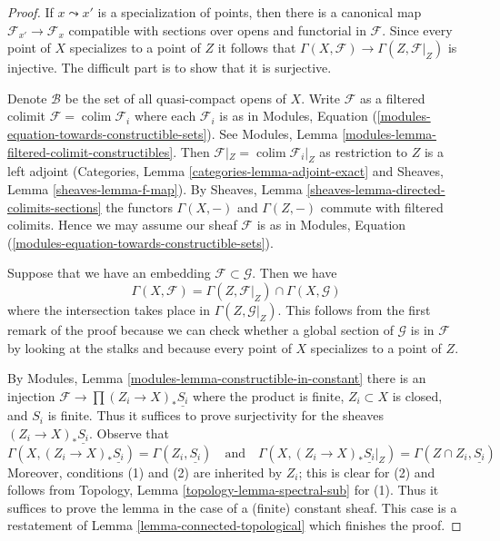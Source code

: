\documentclass[10pt,a4paper]{amsart}
\theoremstyle{plain}
\theoremstyle{definition}
\theoremstyle{remark}
\numberwithin{equation}{subsection}
\def\colim{\mathop{\mathrm{colim}}\nolimits}
\begin{document}
\begin{proof}
If $x \leadsto x'$ is a specialization of points, then there is a
canonical map $\mathcal{F}_{x'} \to \mathcal{F}_x$ compatible with
sections over opens and functorial in $\mathcal{F}$. Since every point
of $X$ specializes to a point of $Z$ it follows that
$\Gamma(X, \mathcal{F}) \to \Gamma(Z, \mathcal{F}|_Z)$ is injective.
The difficult part is to show that it is surjective.

\medskip\noindent
Denote $\mathcal{B}$ be the set of all quasi-compact opens of $X$.
Write $\mathcal{F}$ as a filtered colimit $\mathcal{F} = \colim \mathcal{F}_i$
where each $\mathcal{F}_i$ is as in
Modules, Equation (\ref{modules-equation-towards-constructible-sets}).
See Modules, Lemma \ref{modules-lemma-filtered-colimit-constructibles}.
Then $\mathcal{F}|_Z = \colim \mathcal{F}_i|_Z$ as restriction to $Z$
is a left adjoint (Categories, Lemma \ref{categories-lemma-adjoint-exact} and
Sheaves, Lemma \ref{sheaves-lemma-f-map}).
By Sheaves, Lemma \ref{sheaves-lemma-directed-colimits-sections}
the functors $\Gamma(X, -)$ and $\Gamma(Z, -)$ commute with filtered colimits.
Hence we may assume our sheaf $\mathcal{F}$ is as in
Modules, Equation (\ref{modules-equation-towards-constructible-sets}).

\medskip\noindent
Suppose that we have an embedding $\mathcal{F} \subset \mathcal{G}$.
Then we have
$$
\Gamma(X, \mathcal{F}) =
\Gamma(Z, \mathcal{F}|_Z) \cap \Gamma(X, \mathcal{G})
$$
where the intersection takes place in $\Gamma(Z, \mathcal{G}|_Z)$.
This follows from the first remark of the proof because we can check
whether a global section of $\mathcal{G}$ is in $\mathcal{F}$ by looking
at the stalks and because every point of $X$ specializes to a point of $Z$.

\medskip\noindent
By Modules, Lemma \ref{modules-lemma-constructible-in-constant}
there is an injection $\mathcal{F} \to \prod (Z_i \to X)_*\underline{S_i}$
where the product is finite, $Z_i \subset X$ is closed, and $S_i$ is finite.
Thus it suffices to prove surjectivity for the sheaves
$(Z_i \to X)_*\underline{S_i}$. Observe that
$$
\Gamma(X, (Z_i \to X)_*\underline{S_i}) = \Gamma(Z_i, \underline{S_i})
\quad\text{and}\quad
\Gamma(X, (Z_i \to X)_*\underline{S_i}|_Z) =
\Gamma(Z \cap Z_i, \underline{S_i})
$$
Moreover, conditions (1) and (2) are inherited by $Z_i$; this is clear
for (2) and follows from
Topology, Lemma \ref{topology-lemma-spectral-sub} for (1). Thus it
suffices to prove the lemma in the case of a (finite) constant sheaf.
This case is a restatement of Lemma \ref{lemma-connected-topological}
which finishes the proof.
\end{proof}
\end{document}
